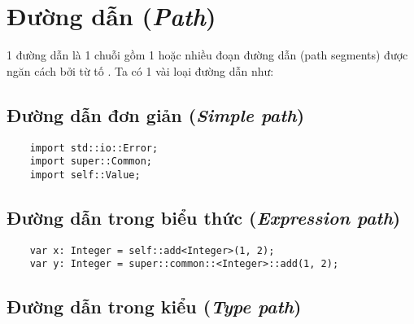 \section{Đường dẫn (\textit{Path})}

1 đường dẫn là 1 chuỗi gồm 1 hoặc nhiều đoạn đường dẫn (path segments) được ngăn cách bởi từ tố \kw{::}. Ta có 1 vài loại đường dẫn như:

\subsection{Đường dẫn đơn giản (\textit{Simple path})}

\regexsimplepath

\begin{lstlisting}
    import std::io::Error;
    import super::Common;
    import self::Value;
\end{lstlisting}

\subsection{Đường dẫn trong biểu thức (\textit{Expression path})}

\regexpathinexpr

\begin{lstlisting}
    var x: Integer = self::add<Integer>(1, 2);
    var y: Integer = super::common::<Integer>::add(1, 2);
\end{lstlisting}

\subsection{Đường dẫn trong kiểu (\textit{Type path})}

\regexpathintype
